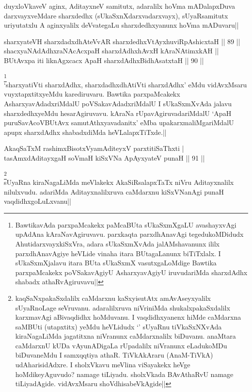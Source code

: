 \begin{artha}
duyxloVkaveV aginx, AditayxneV samitutx, adaralilx hoVma mADalapxDuva 
darxvayxveMdare sharxdedhx (sUkaSxnXdarxvadarxvayx), sUyaRsamitutx 
uriyutatxlu A aginxyalilx deVvategaLu sharxdedhxyanunx hoVma mADuvaru||
\end{artha}


\begin{shl}
sharxyateVH sharxdadxdhAteVvAR sharxdedhxVtAyxhuviRpAshicxtaH \hfill|| 89 || \\
shacxyaNAdAdhxraNAcAcx\s \s paH sharxdAdhxhAvxH kAraNAtimxkAH || \\
BUtAvx\s \s pa iti liknAgxcacx ApaH sharxdAdhxBidhAsatxtaH \hfill|| 90 || 
\end{shl}

\begin{artha}
\footnote[1]{BawtikavAda parxpaMcakekx paMcaBUta sUkaSxmXgaLU 
avashayxvAgi upAdAna kAraNavAgiruvavu. parxkaqta parxdhAnavAgi 
tegedukoMDidudx AhutidarxvayxkiSxVra, adara sUkaSxmXvAda 
jalAMshavanunx ililx parxdhAnavAgiye heVLide vinaha itara BUtagaLanunx 
biTiTxlalx. I sUkaSxmXjalavu itara BUta sUkaSxmX vasutxgaLoMdige 
Bawtika parxpaMcakekx poVSakavAgiyU AsharxyavAgiyU iruvudariMda 
sharxdAdhx shabadx athaRvAgiruvavu||}\\
`sharxyatiVti sharxdAdhx, sharxdadhxdhAtiVti sharxdAdhx' eMdu 
vidAvxMsaru vuyxtapxtitxyeMdu karediruvaru. Bawtika parxpaMcakekx 
AsharxyavAdadxriMdalU poVSakavAdadxriMdalU I sUkaSxmXvAda jalavu 
sharxdedhxyeMdu hesarAgiruvavu. kAraNa rUpavAgiruvadariMdalU `ApaH 
puruSavAcoVBUtAvx samutAthxyavadanitx' eMba upakarxmaliMgariMdalU 
apupx sharxdAdhx shabadxdiMda heVLalapxTiTxde.|| 
\end{artha}


\begin{shl}
AkaqSaTxM rashimxBisotxVyamAditeyxV parxtitiSaThxti | \\
tasAmxdAditayxgaH soVmaH kiSxVNa ApAyxyateV punaH \hfill|| 91 || 
\end{shl}

\begin{artha}
\footnote[1]{kaqSaNxpakaSxdalilx caMdarxnu kaSxyisutAtx 
amAvAseyxyalilx sUyaRnoLage seVruvanu. adaralilxruva niVriniMda 
shukalxpakaSxdalilx karxmavAgi aBivaqdidhx hoMduvanu. I vaqdidhxyanenx 
hiMde caMdarxna saMBUti (utapxtitx) yeMdu heVLidudx `\stext' sUyaRnu 
tiVkaSxNXvAda kiraNagaLiMda jagatitxna niVranunx caMdarxnalilx 
biDuvanu. anaMtara caMdarxnU kUDa vAyunADigaLa rUpadalilx niVranunx 
eLadukoMDu biDuvaneMdu I samxqqtiya athaR. TiVkAkAraru (AnaM-TiVkA) 
udAharisidAdxre. I sholxVkavu meVlina viSayakekx heVge 
hoMdikeyAguvudo? namage tiLiyadu. sholxVkada BAvAthaRvU namage 
tiLiyadAgide. vidAvxMsaru shoVdhisabeVkAgide||}\\
sUyaRna kiraNagaLiMda meVlakekx AkaSiRsalapxTaTx niVru Aditayxnalilx 
nilulxvudu. adariMda Aditayxnalilxruva caMdarxnu kiSxVNanAgi punaH 
vaqdidhxgoLuLxvanu||
\end{artha}

